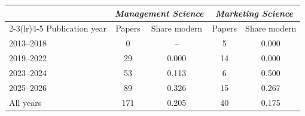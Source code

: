 \begin{tabular}{lcccc}
\toprule
 & \multicolumn{2}{c}{\emph{Management Science}} & \multicolumn{2}{c}{\emph{Marketing Science}} \\
\cmidrule(lr){2-3}\cmidrule(lr){4-5}
Publication year & Papers & Share modern & Papers & Share modern \\
\midrule
2013--2018 & 0 & -- & 5 & 0.000 \\
2019--2022 & 29 & 0.000 & 14 & 0.000 \\
2023--2024 & 53 & 0.113 & 6 & 0.500 \\
2025--2026 & 89 & 0.326 & 15 & 0.267 \\
\midrule
All years & 171 & 0.205 & 40 & 0.175 \\
\bottomrule
\end{tabular}
